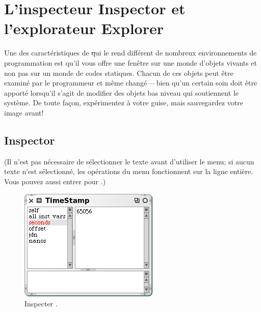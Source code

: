 \documentclass[a4paper,10pt,twoside]{book}
\begin{document}
\section{L'inspecteur Inspector et l'explorateur Explorer}
\label{sec:inspector} %

Une des caract\'eristiques de \st qui le rend diff\'erent de nombreux 
environnements de programmation est qu'il vous offre une fen\^etre 
sur une monde d'objets vivants et non pas sur un monde de codes statiques.
Chacun de ces objets peut \^etre examin\'e par le programmeur et m\^eme
chang\'e\,---\,bien qu'un certain soin doit \^etre apport\'e lorsqu'il s'agit
de modifier des objets bas niveau qui soutiennent le syst\`eme.
De toute fa\c{c}on, exp\'erimentez \`a votre guise, mais sauvegardez votre
image avant!

\subsection{Inspector}

(Il n'est pas n\'ecessaire de s\'electionner le texte avant d'utiliser le menu;
si aucun texte n'est s\'electionn\'e, les op\'erations du menu fonctionnent
sur la ligne enti\`ere.
Vous pouvez aussi entrer  pour .)

\begin{figure}[btp]
	\begin{center}
		\includegraphics[scale=0.7]{inspectTimeNow1}
	\end{center}
	\caption{Inspecter .}
	\label{fig:inspectTimeNow1}
\end{figure}
\end{document}
